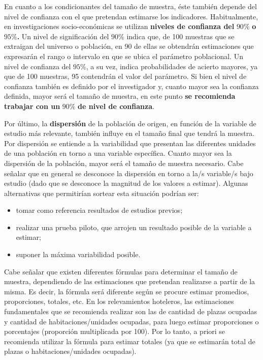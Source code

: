 \documentclass[
]{book}
\begin{document}
En cuanto a los condicionantes del tamaño de muestra, éste también depende del nivel de confianza con el que pretendan estimarse los indicadores. Habitualmente, en investigaciones socio-económicas se utilizan \textbf{niveles de confianza del} \(90\%\) \textbf{o} \(95\%\)\textbf{.} Un nivel de significación del \(90\%\) indica que, de 100 muestras que se extraigan del universo o población, en 90 de ellas se obtendrán estimaciones que expresarán el rango o intervalo en que se ubica el parámetro poblacional. Un nivel de confianza del \(95\%\), a su vez, indica probabilidades de acierto mayores, ya que de 100 muestras, 95 contendrán el valor del parámetro. Si bien el nivel de confianza también es definido por el investigador y, cuanto mayor sea la confianza definida, mayor será el tamaño de muestra, en este punto \textbf{se recomienda trabajar con un} \(90\%\) \textbf{de nivel de confianza}.

Por último, la \textbf{dispersión} de la población de origen, en función de la variable de estudio más relevante, también influye en el tamaño final que tendrá la muestra. Por dispersión se entiende a la variabilidad que presentan las diferentes unidades de una población en torno a una variable específica. Cuanto mayor sea la dispersión de la población, mayor será el tamaño de muestra necesario. Cabe señalar que en general se desconoce la dispersión en torno a la/s variable/s bajo estudio (dado que se desconoce la magnitud de los valores a estimar). Algunas alternativas que permitirían sortear esta situación podrían ser:

\begin{itemize}
\item
  tomar como referencia resultados de estudios previos;
\item
  realizar una prueba piloto, que arrojen un resultado posible de la variable a estimar;
\item
  suponer la máxima variabilidad posible.
\end{itemize}

Cabe señalar que existen diferentes fórmulas para determinar el tamaño de muestra, dependiendo de las estimaciones que pretendan realizarse a partir de la misma. Es decir, la fórmula será diferente según se procure estimar promedios, proporciones, totales, etc. En los relevamientos hoteleros, las estimaciones fundamentales que se recomienda realizar son las de cantidad de plazas ocupadas y cantidad de habitaciones/unidades ocupadas, para luego estimar proporciones o porcentajes (proporción multiplicada por 100). Por lo tanto, a priori se recomienda utilizar la fórmula para estimar totales (ya que se estimarán total de plazas o habitaciones/unidades ocupadas).
\end{document}

